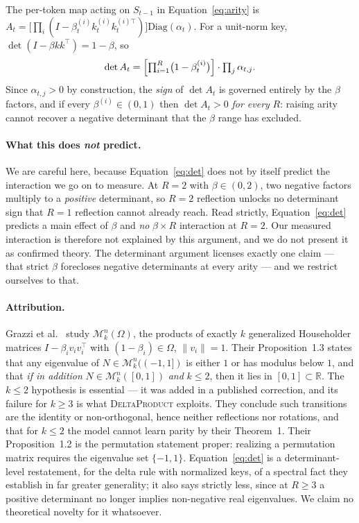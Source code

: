 \documentclass[10pt,twocolumn]{article}
\begin{document}
The per-token map acting on $S_{t-1}$ in Equation~\eqref{eq:arity} is
$A_t = \bigl[\prod_i (I - \beta^{(i)}_t k^{(i)}_t k^{(i)\top}_t)\bigr]
\mathrm{Diag}(\alpha_t)$. For a unit-norm key,
$\det(I - \beta kk^{\top}) = 1 - \beta$, so
\begin{equation}
\label{eq:det}
\det A_t = \Bigl[\textstyle\prod_{i=1}^{R}\bigl(1-\beta_t^{(i)}\bigr)\Bigr]
           \cdot \textstyle\prod_{j} \alpha_{t,j}.
\end{equation}
Since $\alpha_{t,j} > 0$ by construction, the \emph{sign} of $\det A_t$ is
governed entirely by the $\beta$ factors, and if every $\beta^{(i)} \in (0,1)$
then $\det A_t > 0$ \emph{for every} $R$: raising arity cannot recover a
negative determinant that the $\beta$ range has excluded.

\paragraph{What this does \emph{not} predict.}
We are careful here, because Equation~\eqref{eq:det} does not by itself predict
the interaction we go on to measure. At $R=2$ with $\beta\in(0,2)$, two negative
factors multiply to a \emph{positive} determinant, so $R{=}2$ reflection unlocks
no determinant sign that $R{=}1$ reflection cannot already reach. Read strictly,
Equation~\eqref{eq:det} predicts a main effect of $\beta$ and \emph{no}
$\beta\times R$ interaction at $R=2$. Our measured interaction is therefore not
explained by this argument, and we do not present it as confirmed theory. The
determinant argument licenses exactly one claim --- that strict $\beta$
forecloses negative determinants at every arity --- and we restrict ourselves to
that.

\paragraph{Attribution.}
Grazzi et al.\ \cite{grazzi2024negative} study $\mathcal{M}^n_k(\Omega)$, the
products of exactly $k$ generalized Householder matrices
$I - \beta_i v_i v_i^\top$ with $(1-\beta_i) \in \Omega$, $\|v_i\|=1$. Their
Proposition~1.3 states that any eigenvalue of $N \in \mathcal{M}^n_k((-1,1])$ is
either $1$ or has modulus below $1$, and that \emph{if in addition}
$N \in \mathcal{M}^n_k([0,1])$ \emph{and} $k \le 2$, then it lies in
$[0,1]\subset\mathbb{R}$. The $k \le 2$ hypothesis is essential --- it was added
in a published correction, and its failure for $k \ge 3$ is what
\textsc{DeltaProduct} exploits. They conclude such transitions are the identity
or non-orthogonal, hence neither reflections nor rotations, and that for
$k \le 2$ the model cannot learn parity by their Theorem~1. Their
Proposition~1.2 is the permutation statement proper: realizing a permutation
matrix requires the eigenvalue set $\{-1,1\}$. Equation~\eqref{eq:det} is a
determinant-level restatement, for the delta rule with normalized keys, of a
spectral fact they establish in far greater generality; it also says strictly
less, since at $R\ge3$ a positive determinant no longer implies non-negative
real eigenvalues. We claim no theoretical novelty for it whatsoever.
\end{document}
